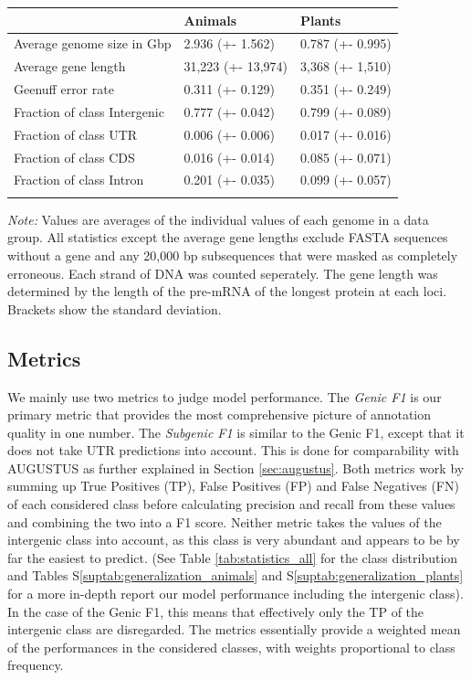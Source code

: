 \documentclass{bioinfo}
\newcounter{suptab}
\begin{document}
\begin{methods}
\begin{table}[!htb]
 {
\begin{tabular}{@{}lll@{}}
\toprule & Animals & Plants\\
\midrule
Average genome size in Gbp& 2.936 (+- 1.562) & 0.787 (+- 0.995) \\
Average gene length & 31,223 (+- 13,974)& 3,368 (+- 1,510)\\
Geenuff error rate & 0.311 (+- 0.129) & 0.351 (+- 0.249) \\
Fraction of class Intergenic  & 0.777 (+- 0.042) & 0.799 (+- 0.089) \\
Fraction of class UTR & 0.006 (+- 0.006) & 0.017 (+- 0.016) \\
Fraction of class CDS & 0.016 (+- 0.014) & 0.085 (+- 0.071) \\
Fraction of class Intron & 0.201 (+- 0.035) & 0.099 (+- 0.057) \\
\botrule
\end{tabular}}{{\it Note:} Values are averages of the individual values of each 
genome in a data group. All statistics except the average gene lengths exclude
FASTA sequences without a gene and any 20,000 bp subsequences that were masked as completely 
erroneous. Each strand of DNA was counted seperately. The gene length was 
determined by the length of the pre-mRNA of the longest protein at each
loci. Brackets show the standard deviation.}
\end{table}


\subsection{Metrics}
\label{sec:metrics}
We mainly use two metrics to judge model performance. The {\it Genic F1} is our 
primary metric that provides the most comprehensive picture of annotation quality 
in one number. The {\it Subgenic F1} is similar to the Genic F1, except that it does 
not take UTR predictions into account. This is done for comparability with AUGUSTUS 
as further explained in Section \ref{sec:augustus}. Both metrics work by summing up 
True Positives (TP), False Positives (FP) and False Negatives (FN) of each 
considered class before calculating precision and recall from these values and 
combining the two into a F1 score. Neither metric takes the values of the 
intergenic class into account, as this class is very abundant and appears to be by 
far the easiest to predict. (See Table \ref{tab:statistics_all} for the class 
distribution and Tables S\ref{suptab:generalization_animals} 
and S\ref{suptab:generalization_plants} for a more in-depth report our model performance 
including the intergenic class). In the case of the Genic F1, this means that 
effectively only the TP of the intergenic class are disregarded. The metrics 
essentially provide a weighted mean of the performances in the considered classes,
with weights proportional to class frequency.


\end{methods}
\end{document}
